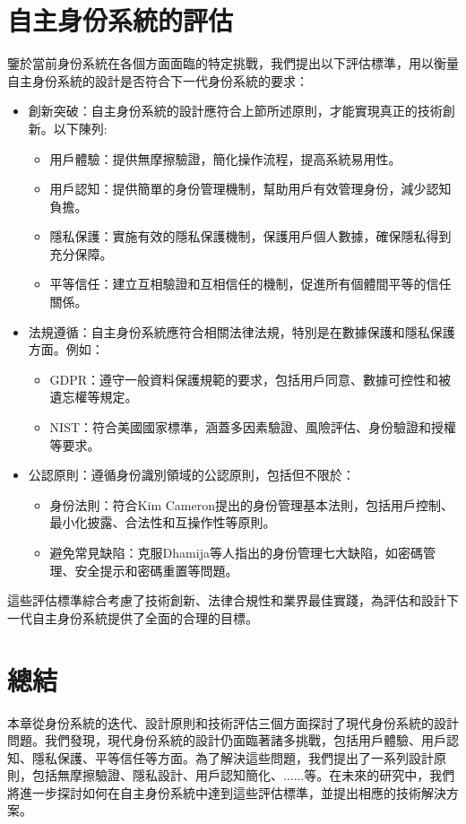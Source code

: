 \section{自主身份系統的評估}
鑒於當前身份系統在各個方面面臨的特定挑戰，我們提出以下評估標準，用以衡量自主身份系統的設計是否符合下一代身份系統的要求：
\begin{itemize}
  \item 創新突破：自主身份系統的設計應符合上節所述原則，才能實現真正的技術創新。以下陳列:
        \begin{itemize}
          \item 用戶體驗：提供無摩擦驗證，簡化操作流程，提高系統易用性。
          \item 用戶認知：提供簡單的身份管理機制，幫助用戶有效管理身份，減少認知負擔。
          \item 隱私保護：實施有效的隱私保護機制，保護用戶個人數據，確保隱私得到充分保障。
          \item 平等信任：建立互相驗證和互相信任的機制，促進所有個體間平等的信任關係。
        \end{itemize}
  \item 法規遵循：自主身份系統應符合相關法律法規，特別是在數據保護和隱私保護方面。例如：
        \begin{itemize}
          \item GDPR：遵守一般資料保護規範\cite{GDPR2016}的要求，包括用戶同意、數據可控性和被遺忘權等規定。
          \item NIST：符合美國國家標準\cite{NIST800-63-3}，涵蓋多因素驗證、風險評估、身份驗證和授權等要求。
        \end{itemize}
  \item 公認原則：遵循身份識別領域的公認原則，包括但不限於：
        \begin{itemize}
          \item 身份法則：符合Kim Cameron提出的身份管理基本法則\cite{cameron2005laws}，包括用戶控制、最小化披露、合法性和互操作性等原則。
          \item 避免常見缺陷：克服Dhamija等人\cite{dhamija2008sevenflaws}指出的身份管理七大缺陷，如密碼管理、安全提示和密碼重置等問題。
        \end{itemize}
\end{itemize}
這些評估標準綜合考慮了技術創新、法律合規性和業界最佳實踐，為評估和設計下一代自主身份系統提供了全面的合理的目標。
\section{總結}
本章從身份系統的迭代、設計原則和技術評估三個方面探討了現代身份系統的設計問題。我們發現，現代身份系統的設計仍面臨著諸多挑戰，包括用戶體驗、用戶認知、隱私保護、平等信任等方面。為了解決這些問題，我們提出了一系列設計原則，包括無摩擦驗證、隱私設計、用戶認知簡化、......等。在未來的研究中，我們將進一步探討如何在自主身份系統中達到這些評估標準，並提出相應的技術解決方案。